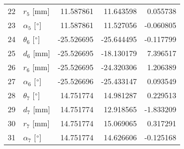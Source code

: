 \documentclass{standalone}%
\begin{document}
\begin{tabular}{llrrr}
22 &              $r_{5}$ [mm] &  11.587861 &  11.643598 &   0.055738 \\
23 &  $\alpha_{5}$ [$\degree$] &  11.587861 &  11.527056 &  -0.060805 \\
24 &  $\theta_{6}$ [$\degree$] & -25.526695 & -25.644495 &  -0.117799 \\
25 &              $d_{6}$ [mm] & -25.526695 & -18.130179 &   7.396517 \\
26 &              $r_{6}$ [mm] & -25.526695 & -24.320306 &   1.206389 \\
27 &  $\alpha_{6}$ [$\degree$] & -25.526696 & -25.433147 &   0.093549 \\
28 &  $\theta_{7}$ [$\degree$] &  14.751774 &  14.981287 &   0.229513 \\
29 &              $d_{7}$ [mm] &  14.751774 &  12.918565 &  -1.833209 \\
30 &              $r_{7}$ [mm] &  14.751774 &  15.069065 &   0.317291 \\
31 &  $\alpha_{7}$ [$\degree$] &  14.751774 &  14.626606 &  -0.125168 \\
\bottomrule
\end{tabular}
%
\end{document}

